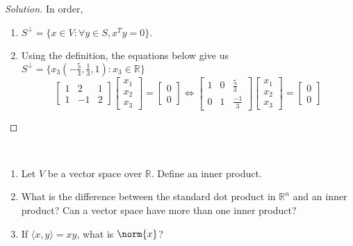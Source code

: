 \documentclass[crop=false,class=book,oneside]{standalone}                      %
\begin{document}
        \begin{proof}[Solution]
        In order,
        \begin{enumerate}
            \item $S^{\perp} = \{x\in V: \forall y\in S, x^T y = 0\}$.
            \item Using the definition, the equations below give us $S^{\perp}=\{x_{3}(-\frac{5}{3},\frac{1}{3},1):x_{3}\in \mathbb{R}\}$
            \begin{equation*}
                \begin{bmatrix}1&2&1\\1&-1&2\end{bmatrix}\begin{bmatrix}x_1\\x_2\\x_3\end{bmatrix}=\begin{bmatrix}0\\0\end{bmatrix}\Leftrightarrow\begin{bmatrix}1&0&\frac{5}{3} \\0&1&\frac{-1}{3}\end{bmatrix}\begin{bmatrix}x_1\\x_2\\x_3\end{bmatrix}=\begin{bmatrix}0\\0\end{bmatrix}
            \end{equation*}
        \end{enumerate}
        \end{proof}
        \begin{problem}
        \
        \begin{enumerate}
            \item Let $V$ be a vector space over $\mathbb{R}$. Define an inner product.
            \item What is the difference between the standard dot product in $\mathbb{R}^n$ and an inner product? Can a vector space have more than one inner product?
            \item If $\langle x,y \rangle = xy$, what is $\norm{x}$?
        \end{enumerate}
        \end{problem}
\end{document}
